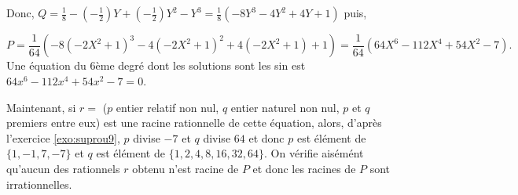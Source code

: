 {{Donc, $Q=\frac{1}{8}-(-\frac{1}{2})Y+(-\frac{1}{2})Y^2-Y^3=\frac{1}{8}(-8Y^3-4Y^2+4Y+1)$ puis,
 
$$P=\frac{1}{64}(-8(-2X^2+1)^3-4(-2X^2+1)^2+4(-2X^2+1)+1)=\frac{1}{64}(64X^6-112X^4+54X^2-7).$$
Une équation du $6$ème degré dont les solutions sont les sin est $64x^6-112x^4+54x^2-7=0$.

Maintenant, si $r=$ ($p$ entier relatif non nul, $q$ entier naturel  non nul, $p$ et $q$ premiers entre eux) est une racine rationnelle de cette équation, alors, d'après l'exercice \ref{exo:suprou9}, $p$ divise $-7$ et $q$ divise $64$ et donc 
$p$ est élément de $\{1,-1,7,-7\}$ et $q$ est élément de $\{1,2,4,8,16,32,64\}$. On vérifie aisémént qu'aucun des rationnels $r$ obtenu n'est racine de $P$ et donc les racines de $P$ sont irrationnelles.}
}